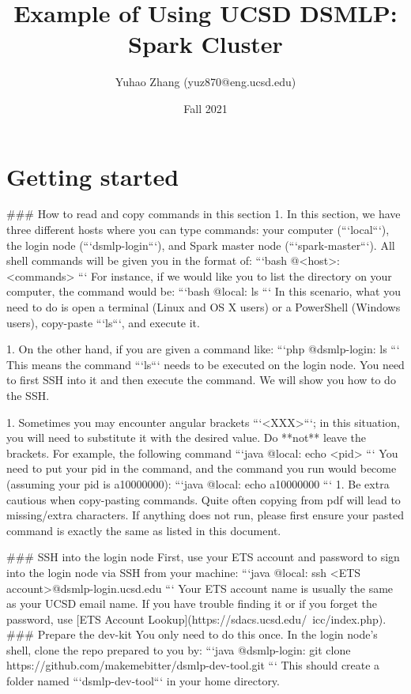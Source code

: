 \documentclass{article}
\title{Example of Using UCSD DSMLP: Spark Cluster}
\date{Fall 2021}
\author{Yuhao Zhang (yuz870@eng.ucsd.edu)}
\begin{document}
\maketitle


\section{Getting started}\label{start}
\begin{markdown}
### How to read and copy commands in this section
1. In this section, we have three different hosts where you can type commands: your computer (```local```), the login node (```dsmlp-login```), and Spark master node (```spark-master```). All shell commands will be given you in the format of:
  ```bash
  @<host>: <commands>
  ```
  For instance, if we would like you to list the directory on your computer, the command would be:
  ```bash
  @local: ls
  ```
  In this scenario, what you need to do is open a terminal (Linux and OS X users) or a PowerShell (Windows users), copy-paste ```ls```, and execute it.

1. On the other hand, if you are given a command like:
  ```php
  @dsmlp-login: ls
  ```
  This means the command ```ls``` needs to be executed on the login node. You need to first SSH into it and then execute the command. We will show you how to do the SSH.

1. Sometimes you may encounter angular brackets ```<XXX>```; in this situation, you will need to substitute it with the desired value. Do **not** leave the brackets. For example, the following command
  ```java
  @local: echo <pid>
  ```
  You need to put your pid in the command, and the command you run would become (assuming your pid is a10000000):
  ```java
  @local: echo a10000000
  ```
1. Be extra cautious when copy-pasting commands. Quite often copying from pdf will lead to missing/extra characters. If anything does not run, please first ensure your pasted command is exactly the same as listed in this document.

### SSH into the login node
First, use your ETS account and password to sign into the login node via SSH from your machine:
```java
@local: ssh <ETS account>@dsmlp-login.ucsd.edu
```
Your ETS account name is usually the same as your UCSD email name. If you have trouble finding it or if you forget the password, use [ETS Account Lookup](https://sdacs.ucsd.edu/~icc/index.php).
### Prepare the dev-kit
You only need to do this once. In the login node's shell, clone the repo prepared to you by:
```java
@dsmlp-login:
	git clone https://github.com/makemebitter/dsmlp-dev-tool.git
```
This should create a folder named ```dsmlp-dev-tool``` in your home directory.


\end{markdown}
\end{document}
